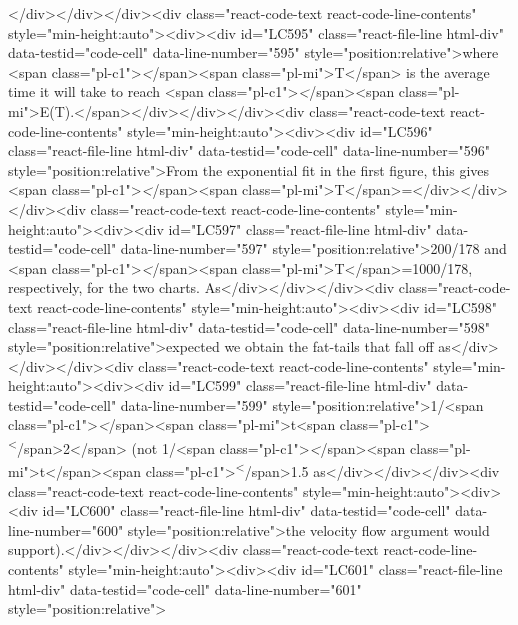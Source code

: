 {{{{</div></div></div><div class="react-code-text react-code-line-contents" style="min-height:auto"><div><div id="LC595" class="react-file-line html-div" data-testid="code-cell" data-line-number="595" style="position:relative">where <span class="pl-c1">\emph</span>{<span class="pl-mi">T</span>} is the average time it will take to reach <span class="pl-c1">\emph</span>{<span class="pl-mi">E(T).</span>}</div></div></div><div class="react-code-text react-code-line-contents" style="min-height:auto"><div><div id="LC596" class="react-file-line html-div" data-testid="code-cell" data-line-number="596" style="position:relative">From the exponential fit in the first figure, this gives <span class="pl-c1">\emph</span>{<span class="pl-mi">T</span>}=</div></div></div><div class="react-code-text react-code-line-contents" style="min-height:auto"><div><div id="LC597" class="react-file-line html-div" data-testid="code-cell" data-line-number="597" style="position:relative">200/178 and <span class="pl-c1">\emph</span>{<span class="pl-mi">T</span>}=1000/178, respectively, for the two charts. As</div></div></div><div class="react-code-text react-code-line-contents" style="min-height:auto"><div><div id="LC598" class="react-file-line html-div" data-testid="code-cell" data-line-number="598" style="position:relative">expected we obtain the fat-tails that fall off as</div></div></div><div class="react-code-text react-code-line-contents" style="min-height:auto"><div><div id="LC599" class="react-file-line html-div" data-testid="code-cell" data-line-number="599" style="position:relative">1/<span class="pl-c1">\emph</span>{<span class="pl-mi">t<span class="pl-c1">\textsuperscript</span>{2}</span>} (not 1/<span class="pl-c1">\emph</span>{<span class="pl-mi">t</span>}<span class="pl-c1">\textsuperscript</span>{1.5} as</div></div></div><div class="react-code-text react-code-line-contents" style="min-height:auto"><div><div id="LC600" class="react-file-line html-div" data-testid="code-cell" data-line-number="600" style="position:relative">the velocity flow argument would support).</div></div></div><div class="react-code-text react-code-line-contents" style="min-height:auto"><div><div id="LC601" class="react-file-line html-div" data-testid="code-cell" data-line-number="601" style="position:relative">
}}}}
